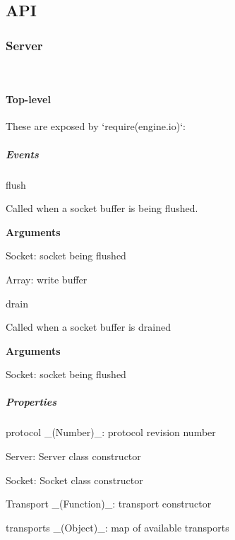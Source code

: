 \subsection*{A\+PI}

\subsubsection*{Server}



~\newline


\paragraph*{Top-\/level}

These are exposed by `require(\textquotesingle{}engine.\+io\textquotesingle{})`\+:

\subparagraph*{Events}


\begin{DoxyItemize}
\item {\ttfamily flush}
\begin{DoxyItemize}
\item Called when a socket buffer is being flushed.
\item {\bfseries Arguments}
\begin{DoxyItemize}
\item {\ttfamily Socket}\+: socket being flushed
\item {\ttfamily Array}\+: write buffer
\end{DoxyItemize}
\end{DoxyItemize}
\item {\ttfamily drain}
\begin{DoxyItemize}
\item Called when a socket buffer is drained
\item {\bfseries Arguments}
\begin{DoxyItemize}
\item {\ttfamily Socket}\+: socket being flushed
\end{DoxyItemize}
\end{DoxyItemize}
\end{DoxyItemize}

\subparagraph*{Properties}


\begin{DoxyItemize}
\item {\ttfamily protocol} \+\_\+(\+Number)\+\_\+\+: protocol revision number
\item {\ttfamily Server}\+: Server class constructor
\item {\ttfamily Socket}\+: Socket class constructor
\item {\ttfamily Transport} \+\_\+(\+Function)\+\_\+\+: transport constructor
\item {\ttfamily transports} \+\_\+(\+Object)\+\_\+\+: map of available transports
\end{DoxyItemize}

